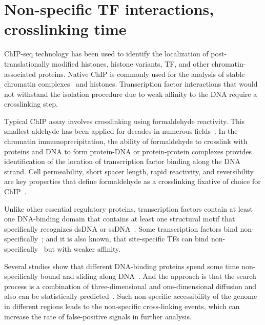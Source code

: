 \section{Non-specific TF interactions, crosslinking time}

ChIP-seq technology has been used to identify the localization of post-translationally modified histones, histone variants, TF, and other chromatin-associated proteins.
Native ChIP is commonly used for the analysis of stable chromatin complexes~\cite{kasinathan2014high} and histones.
Transcription factor interactions that would not withstand the isolation procedure due to weak affinity to the DNA require a crosslinking step.


Typical ChIP assay involves crosslinking using formaldehyde reactivity. 
This smallest aldehyde has been applied for decades in numerous fields~\cite{eckels2003formalin,werner2000effect,gavrilov2015vivo}.
In the chromatin immunoprecipitation, the ability of formaldehyde to crosslink with proteins and DNA to form protein-DNA or protein-protein complexes provides identification of the location of transcription factor binding along the DNA strand.
Cell permeability, short spacer length, rapid reactivity, and reversibility are key properties that define formaldehyde as a crosslinking fixative of choice for ChIP~\cite{hoffman2015formaldehyde}.

Unlike other essential regulatory proteins, transcription factors contain at least one DNA-binding domain that contains at least one structural motif that specifically recognizes dsDNA or ssDNA~\cite{mitchell1989transcriptional}.
Some transcription factors bind non-specifically~\cite{struhl2007interpreting};
and it is also known, that site-specific TFs can bind non-specifically~\cite{hammar2012lac,mirny2009protein} but with weaker affinity.

Several studies show that different DNA-binding proteins spend some time non-specifically bound and sliding along DNA~\cite{slutsky2004kinetics,mirny2010nucleosome,cherstvy2008protein,hu2006proteins,sheinman2009effects}.
And the approach is that the search process is a combination of three-dimensional and one-dimensional diffusion and also can be statistically predicted~\cite{sela2011dna}.
Such non-specific accessibility of the genome in different regions leads to the non-specific cross-linking events, which can increase the rate of false-positive signals in further analysis.

